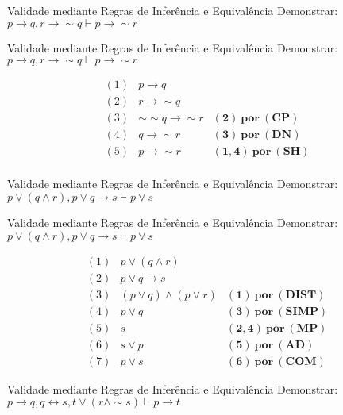 \begin{frame}[t]{Validade mediante Regras de Inferência e Equivalência}
	Demonstrar: $p \rightarrow q, r \rightarrow\sim q \vdash p \rightarrow\sim r$
\end{frame}


\begin{frame}[t]{Validade mediante Regras de Inferência e Equivalência}
	Demonstrar: $p \rightarrow q, r \rightarrow\sim q \vdash p \rightarrow\sim r$
	
	\vskip 0.5cm
	
	$$\begin{array}{lll}
	(1) & p \rightarrow q  & \\
	(2) & r \rightarrow\sim q & \\
	\hline
	(3) & \sim\sim q \rightarrow\sim r & \mathbf{(2)~por~(CP)}\\
	(4) & q \rightarrow\sim r & \mathbf{(3)~por~(DN)} \\
	(5) & p \rightarrow\sim r & \mathbf{(1,4)~por~(SH)} \\
	\end{array}$$	
\end{frame}


\begin{frame}[t]{Validade mediante Regras de Inferência e Equivalência}
	Demonstrar: $p \vee (q \wedge r), p \vee q \rightarrow s \vdash p \vee s$
\end{frame}


\begin{frame}[t]{Validade mediante Regras de Inferência e Equivalência}
	Demonstrar: $p \vee (q \wedge r), p \vee q \rightarrow s \vdash p \vee s$
	
	\vskip 0.5cm
	
	$$\begin{array}{lll}
	(1) & p \vee (q \wedge r)  & \\
	(2) & p \vee q \rightarrow s & \\
	\hline
	(3) & (p \vee q) \wedge (p \vee r) & \mathbf{(1)~por~(DIST)}\\
	(4) & p \vee q & \mathbf{(3)~por~(SIMP)} \\
	(5) & s & \mathbf{(2,4)~por~(MP)} \\
	(6) & s \vee p & \mathbf{(5)~por~(AD)} \\
	(7) & p \vee s & \mathbf{(6)~por~(COM)}
	\end{array}$$	
\end{frame}


\begin{frame}[t]{Validade mediante Regras de Inferência e Equivalência}
	Demonstrar: $p \rightarrow q, q \leftrightarrow s, t \vee (r \wedge\sim s) \vdash p \rightarrow t$
\end{frame}


